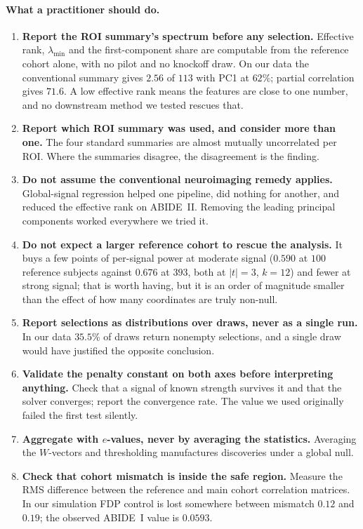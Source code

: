 \documentclass[11pt,a4paper]{article}
\newcommand{\ld}{\lambda_{\min}}
\begin{document}
\paragraph{What a practitioner should do.}
\begin{enumerate}[leftmargin=1.7em,itemsep=3pt]
  \item \textbf{Report the ROI summary's spectrum before any selection.}
  Effective rank, $\ld$ and the first-component share are computable from
  the reference cohort alone, with no pilot and no knockoff draw. On our
  data the conventional summary gives $2.56$ of $113$ with PC1 at $62\%$;
  partial correlation gives $71.6$. A low effective rank means the features
  are close to one number, and no downstream method we tested rescues that.
  \item \textbf{Report which ROI summary was used, and consider more than
  one.} The four standard summaries are almost mutually uncorrelated per
  ROI. Where the summaries disagree, the disagreement is the finding.
  \item \textbf{Do not assume the conventional neuroimaging remedy
  applies.} Global-signal regression helped one pipeline, did nothing for
  another, and reduced the effective rank on ABIDE~II. Removing the leading
  principal components worked everywhere we tried it.
  \item \textbf{Do not expect a larger reference cohort to rescue the
  analysis.} It buys a few points of per-signal power at moderate signal
  ($0.590$ at $100$ reference subjects against $0.676$ at $393$, both at
  $|t|=3$, $k=12$) and fewer at strong signal; that is worth having, but it
  is an order of magnitude smaller than the effect of how many coordinates
  are truly non-null.
  \item \textbf{Report selections as distributions over draws, never as a
  single run.} In our data $35.5\%$ of draws return nonempty selections, and
  a single draw would have justified the opposite conclusion.
  \item \textbf{Validate the penalty constant on both axes before
  interpreting anything.} Check that a signal of known strength survives it
  and that the solver converges; report the convergence rate. The value we
  used originally failed the first test silently.
  \item \textbf{Aggregate with $e$-values, never by averaging the
  statistics.} Averaging the $W$-vectors and thresholding manufactures
  discoveries under a global null.
  \item \textbf{Check that cohort mismatch is inside the safe region.}
  Measure the RMS difference between the reference and main cohort
  correlation matrices. In our simulation FDP control is lost somewhere
  between mismatch $0.12$ and $0.19$; the observed ABIDE~I value is
  $0.0593$.
\end{enumerate}
\end{document}
